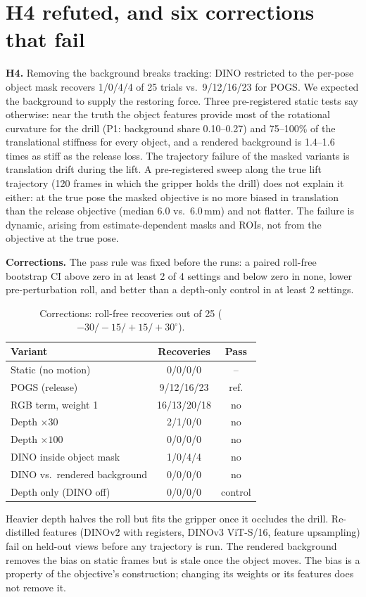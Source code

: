 \documentclass[conference]{IEEEtran}
\begin{document}
\section{H4 refuted, and six corrections that fail}\label{sec:fixes}
\textbf{H4.} Removing the background breaks tracking: DINO restricted to the per-pose object mask recovers 1/0/4/4 of
25 trials vs.\ 9/12/16/23 for POGS. We expected the background to supply the restoring force. Three pre-registered
static tests say otherwise: near the truth the object features provide most of the rotational curvature for the
drill (P1: background share 0.10--0.27) and 75--100\% of the translational stiffness for every object, and a
rendered background is 1.4--1.6 times as stiff as the release loss. The trajectory failure of the masked variants is
translation drift during the lift. A pre-registered sweep along the true lift trajectory (120 frames in which
the gripper holds the drill) does not explain it either: at the true pose the masked objective is no more biased in
translation than the release objective (median 6.0 vs.\ 6.0\,mm) and not flatter. The failure is dynamic, arising
from estimate-dependent masks and ROIs, not from the objective at the true pose.

\textbf{Corrections.} The pass rule was fixed before the runs: a paired roll-free bootstrap CI above zero in at least
2 of 4 settings and below zero in none, lower pre-perturbation roll, and better than a depth-only control in at least
2 settings.
\begin{table}[t]\centering\caption{Corrections: roll-free recoveries out of 25 ($-30/-15/+15/+30^\circ$).}\label{tab:fixes}
\begin{tabular}{lcc}\toprule Variant & Recoveries & Pass\\\midrule
Static (no motion) & 0/0/0/0 & --\\
POGS (release) & 9/12/16/23 & ref.\\
RGB term, weight 1 & 16/13/20/18 & no\\
Depth $\times30$ & 2/1/0/0 & no\\ Depth $\times100$ & 0/0/0/0 & no\\
DINO inside object mask & 1/0/4/4 & no\\ DINO vs.\ rendered background & 0/0/0/0 & no\\
Depth only (DINO off) & 0/0/0/0 & control\\\bottomrule\end{tabular}\end{table}
Heavier depth halves the roll but fits the gripper once it occludes the drill. Re-distilled features (DINOv2 with
registers, DINOv3 ViT-S/16, feature upsampling) fail on held-out views before any trajectory is run. The rendered
background removes the bias on static frames but is stale once the object moves. The bias is a property of the
objective's construction; changing its weights or its features does not remove it.
\end{document}
